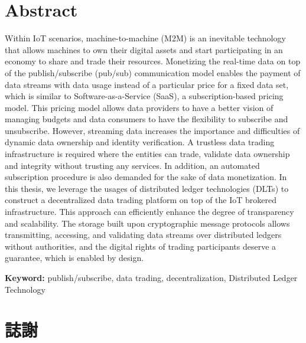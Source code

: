 \chapter*{Abstract}
\pagestyle{plain}

\begin{spacing}{2.0}

Within IoT scenarios, machine-to-machine (M2M) is an inevitable technology that allows machines to own their digital assets and start participating in an economy to share and trade their resources. Monetizing the real-time data on top of the publish/subscribe (pub/sub) communication model enables the payment of data streams with data usage instead of a particular price for a fixed data set, which is similar to Software-as-a-Service (SaaS), a subscription-based pricing model. This pricing model allows data providers to have a better vision of managing budgets and data consumers to have the flexibility to subscribe and unsubscribe. However, streaming data increases the importance and difficulties of dynamic data ownership and identity verification. A trustless data trading infrastructure is required where the entities can trade, validate data ownership and integrity without trusting any services. In addition, an automated subscription procedure is also demanded for the sake of data monetization. In this thesis, we leverage the usages of distributed ledger technologies (DLTs) to construct a decentralized data trading platform on top of the IoT brokered infrastructure. This approach can efficiently enhance the degree of transparency and scalability. The storage built upon cryptographic message protocols allows transmitting, accessing, and validating data streams over distributed ledgers without authorities, and the digital rights of trading participants deserve a guarantee, which is enabled by design.

\end{spacing}

\par{\noindent \bf Keyword:}{ publish/subscribe, data trading, decentralization, Distributed Ledger Technology }
\clearpage
{}


\newpage
{}
\chapter*{誌謝}
\pagestyle{plain}

